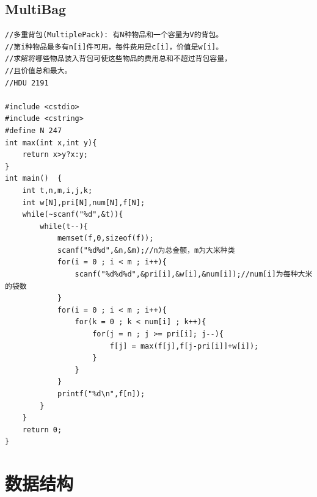 \documentclass[twoside]{article}
\begin{document}
\subsection{MultiBag}
\begin{lstlisting}
//多重背包(MultiplePack): 有N种物品和一个容量为V的背包。  
//第i种物品最多有n[i]件可用，每件费用是c[i]，价值是w[i]。  
//求解将哪些物品装入背包可使这些物品的费用总和不超过背包容量，  
//且价值总和最大。  
//HDU 2191  
  
#include <cstdio>  
#include <cstring>  
#define N 247  
int max(int x,int y){
    return x>y?x:y;  
}  
int main()  {  
    int t,n,m,i,j,k;  
    int w[N],pri[N],num[N],f[N];  
    while(~scanf("%d",&t)){  
        while(t--){  
            memset(f,0,sizeof(f));  
            scanf("%d%d",&n,&m);//n为总金额，m为大米种类  
            for(i = 0 ; i < m ; i++){  
                scanf("%d%d%d",&pri[i],&w[i],&num[i]);//num[i]为每种大米的袋数  
            }  
            for(i = 0 ; i < m ; i++){  
                for(k = 0 ; k < num[i] ; k++){  
                    for(j = n ; j >= pri[i]; j--){  
                        f[j] = max(f[j],f[j-pri[i]]+w[i]);  
                    }  
                }  
            }  
            printf("%d\n",f[n]);  
        }  
    }  
    return 0;  
}  \end{lstlisting}
\clearpage\section{数据结构}
\end{document}
